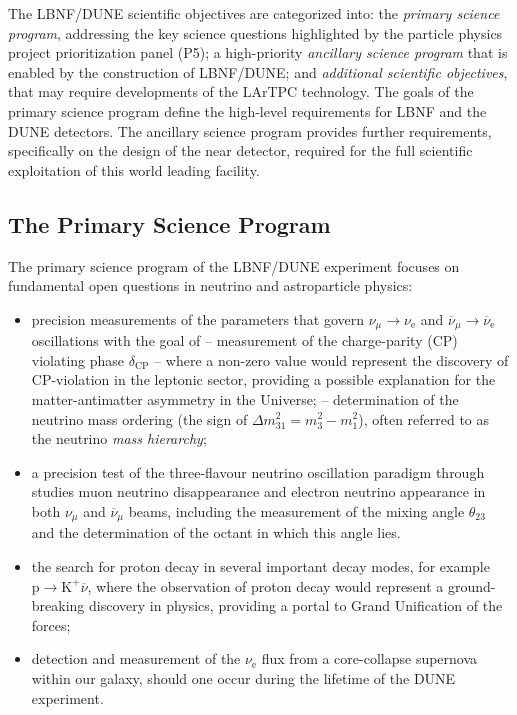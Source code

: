 The LBNF/DUNE scientific objectives are categorized into: the {\it primary science program}, addressing the key science questions highlighted by the particle physics project prioritization panel (P5); 
a high-priority {\it ancillary science program} that is 
enabled by the construction of LBNF/DUNE; and {\it additional scientific objectives}, that may require developments 
of the LArTPC technology. The goals of the primary science program define the high-level requirements for LBNF and the 
DUNE detectors. The ancillary science program provides further requirements, specifically on the design of the near 
detector, required for the full scientific exploitation of this world leading facility.

\subsection{The Primary Science Program}

The primary science program of the LBNF/DUNE experiment focuses on fundamental open questions in neutrino and astroparticle physics: 
\begin{itemize}
  \item precision measurements of the parameters that govern $\nu_{\mu} \rightarrow \nu_\text{e}$ and
           $\overline{\nu}_{\mu} \rightarrow \overline{\nu}_\text{e}$ oscillations with the goal of
  \subitem -- measurement of the charge-parity (CP) violating phase $\delta_\text{CP}$ -- where a non-zero value would represent the discovery of CP-violation in the leptonic sector, providing a possible explanation for the matter-antimatter asymmetry in the Universe;
  \subitem -- determination of the neutrino mass ordering (the sign of $\Delta m^2_{31} = m_3^2-m_1^2$), often referred to as the neutrino {\it mass hierarchy};  
    \item a precision test of the three-flavour neutrino oscillation paradigm through studies muon neutrino disappearance 
    and electron neutrino appearance in both $\nu_\mu$ and $\overline{\nu}_{\mu}$ beams, including the 
    measurement of the mixing angle $\theta_{23}$ and the determination of the octant in which this angle lies.
    \item the search for proton decay in several important decay modes, for example $\text{p}\rightarrow\text{K}^+\overline{\nu}$, where the observation of proton decay would represent a ground-breaking discovery in physics, providing a portal to Grand Unification of the forces;
    \item detection and measurement of the $\nu_\text{e}$ flux from a core-collapse supernova within our galaxy, should one occur during the lifetime of the DUNE experiment.
\end{itemize}

